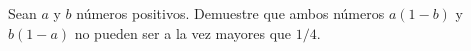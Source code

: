 \item Sean $a$ y $b$ números positivos. Demuestre que ambos números $a(1 - b)$ y $b(1 - a)$ no pueden ser a la vez mayores que $1/4$.
